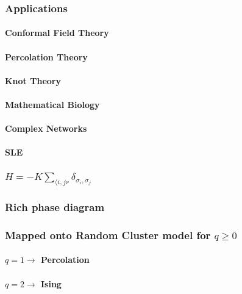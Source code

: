 \documentclass{umthesis}
\newcommand{\lb}{{\langle}}
\begin{document}
\subsubsection{Applications}
\label{sec-3.1.1.2}
\paragraph{Conformal Field Theory}
\label{sec-3.1.1.2.1}
\paragraph{Percolation Theory}
\label{sec-3.1.1.2.2}
\paragraph{Knot Theory}
\label{sec-3.1.1.2.3}
\paragraph{Mathematical Biology}
\label{sec-3.1.1.2.4}
\paragraph{Complex Networks}
\label{sec-3.1.1.2.5}
\paragraph{SLE}
\label{sec-3.1.1.2.6}
\subsubsection{$H=-K \displaystyle\sum_{\lb i,j r} \delta_{\sigma_i, \sigma_j}$}
\label{sec-3.1.1.3}
\subsubsection{Rich phase diagram}
\label{sec-3.1.1.4}
\subsubsection{Mapped onto Random Cluster model for $q \ge 0$}
\label{sec-3.1.1.5}
\paragraph{$q = 1 \to$ Percolation}
\label{sec-3.1.1.5.1}
\paragraph{$q = 2 \to$ Ising}
\label{sec-3.1.1.5.2}
\end{document}
